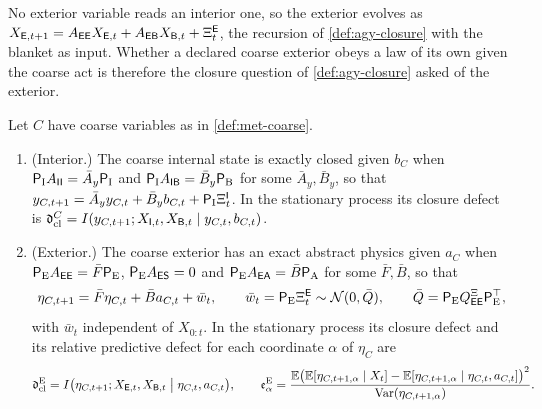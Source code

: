 No exterior variable reads an interior one, so the exterior evolves as $X_{\mathsf{E},t+1}=A_{\mathsf{E}\mathsf{E}}X_{\mathsf{E},t}+A_{\mathsf{E}\mathsf{B}}X_{\mathsf{B},t}+\Xi^{\mathsf{E}}_t$, the recursion of \cref{def:agy-closure} with the blanket as input. Whether a declared coarse exterior obeys a law of its own given the coarse act is therefore the closure question of \cref{def:agy-closure} asked of the exterior.

\begin{definition}\label{def:met-abstract-physics}
Let $C$ have coarse variables as in \cref{def:met-coarse}.
\begin{enumerate}
\item[(i)] (Interior.) The coarse internal state is exactly closed given $b_C$ when $\mathsf P_{\mathrm I}A_{\mathsf{I}\mathsf{I}}=\bar A_y\mathsf P_{\mathrm I}$ and $\mathsf P_{\mathrm I}A_{\mathsf{I}\mathsf{B}}=\bar B_y\mathsf P_{\mathrm B}$ for some $\bar A_y,\bar B_y$, so that $y_{C,t+1}=\bar A_yy_{C,t}+\bar B_yb_{C,t}+\mathsf P_{\mathrm I}\Xi^{\mathsf{I}}_t$. In the stationary process its closure defect is $\mathfrak d^C_{\mathrm{cl}}=I(y_{C,t+1};X_{\mathsf{I},t},X_{\mathsf{B},t}\mid y_{C,t},b_{C,t})$.
\item[(ii)] (Exterior.) The coarse exterior has an exact abstract physics given $a_C$ when $\mathsf P_{\mathrm E}A_{\mathsf{E}\mathsf{E}}=\bar F\mathsf P_{\mathrm E}$, $\mathsf P_{\mathrm E}A_{\mathsf{E}\mathsf{S}}=0$ and $\mathsf P_{\mathrm E}A_{\mathsf{E}\mathsf{A}}=\bar B\mathsf P_{\mathrm A}$ for some $\bar F,\bar B$, so that
\begin{equation}\label{eq:met-abstract-physics}
\eta_{C,t+1}=\bar F\eta_{C,t}+\bar Ba_{C,t}+\bar w_t,\qquad\bar w_t=\mathsf P_{\mathrm E}\Xi^{\mathsf{E}}_t\sim\mathcal{N}(0,\bar Q),\qquad\bar Q=\mathsf P_{\mathrm E}Q^{\Xi}_{\mathsf{E}\mathsf{E}}\mathsf P_{\mathrm E}^\top,
\end{equation}
with $\bar w_t$ independent of $X_{0:t}$. In the stationary process its closure defect and its relative predictive defect for each coordinate $\alpha$ of $\eta_C$ are
\begin{equation}\label{eq:met-exterior-defects}
\mathfrak d^{\mathrm E}_{\mathrm{cl}}=I\bigl(\eta_{C,t+1};X_{\mathsf{E},t},X_{\mathsf{B},t}\bigm|\eta_{C,t},a_{C,t}\bigr),\qquad\mathfrak e^{\mathrm E}_\alpha=\frac{\mathbb{E}\bigl(\mathbb{E}[\eta_{C,t+1,\alpha}\mid X_t]-\mathbb{E}[\eta_{C,t+1,\alpha}\mid\eta_{C,t},a_{C,t}]\bigr)^2}{\operatorname{Var}(\eta_{C,t+1,\alpha})}.
\end{equation}

\end{enumerate}
\end{definition}
